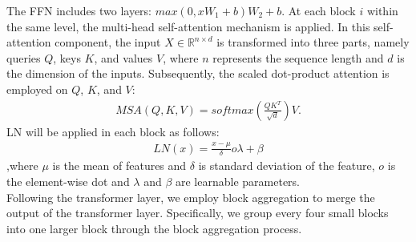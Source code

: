 \documentclass[review,12pt, 3p]{elsarticle}
\begin{document}
The FFN includes two layers: $max(0, xW_1 + b)W_2  + b$. At each block $i$ within the same level, the multi-head self-attention mechanism is applied. In this self-attention component, the input $X \in \mathbb{R}^{n \times d}$ is transformed into three parts, namely queries $Q$, keys $K$, and values $V$, where $n$ represents the sequence length and $d$ is the dimension of the inputs. Subsequently, the scaled dot-product attention is employed on $Q$, $K$, and $V$:
\begin{equation}
\begin{aligned}
MSA(Q,K,V) = softmax(\frac{QK^T}{\sqrt{d}})V.
\end{aligned}
\label{self-attention-eqation1}
\end{equation}
LN will be applied in each block as follows:
\begin{equation}
\begin{aligned}
LN(x) =\frac{x-\mu}{\delta}o \lambda +\beta
\end{aligned}
\label{normalization-eqation1}
\end{equation}
,where $\mu$ is the mean of features and $\delta$ is standard deviation of the feature, $o$ is the element-wise dot and $ \lambda$ and $ \beta$ are learnable parameters. \\
Following the transformer layer, we employ block aggregation to merge the output of the transformer layer. Specifically, we group every four small blocks into one larger block through the block aggregation process. 
\end{document}
